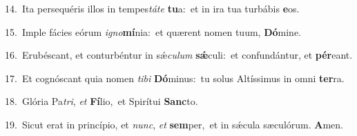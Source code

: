 {\numbfont\textcolor{\numbcolor}{14.}}~Ita persequéris illos in tempes\-\textit{tá}\-\textit{te} \textbf{tu}\-a:~\star et in ira tua turbábis \textbf{e}\-os.\par
{\numbfont\textcolor{\numbcolor}{15.}}~Imple fácies eórum \textit{i}\-\textit{gno}\textbf{mí}nia:~\star et quærent nomen tuum, \textbf{Dó}\-mine.\par
{\numbfont\textcolor{\numbcolor}{16.}}~Erubéscant, et conturbéntur in sǽ\-\textit{cu}\-\textit{lum} \textbf{sǽ}\-culi:~\star et confundántur, et \textbf{pér}\-eant.\par
{\numbfont\textcolor{\numbcolor}{17.}}~Et cognóscant quia nomen \textit{ti}\-\textit{bi} \textbf{Dó}\-minus:~\star tu solus Altíssimus in omni \textbf{ter}\-ra.\par
{\numbfont\textcolor{\numbcolor}{18.}}~Glória Pa\-\textit{tri}\-, \textit{et} \textbf{Fí}\-lio,~\star et Spirítui \textbf{Sanc}\-to.\par
{\numbfont\textcolor{\numbcolor}{19.}}~Sicut erat in princípio, et \textit{nunc}\-, \textit{et} \textbf{sem}\-per,~\star et in sǽcula sæculórum. \textbf{A}\-men.\par
